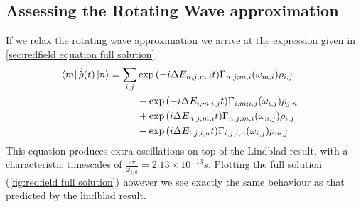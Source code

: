 \subsection{Assessing the Rotating Wave approximation}
If we relax the rotating wave approximation
we arrive at the expression given in \cref{sec:redfield equation full solution}.
\begin{align}
  \bra{m}\dot{\hat{\rho{}}}(t) \ket{n} & = \begin{aligned}[t]
    \sum_{i,j} &
    \exp{(-i\Delta{}E_{n,j;m,i} t)}
    \Gamma_{n,j;m, i}(\omega_{m,i})
    \rho_{i,j}   \\
               &
    -\exp{(-i\Delta{}E_{i,m;i,j} t)}
    \Gamma_{i,m;i, j}(\omega_{i,j})
    \rho_{j, n}  \\
               &
    +\exp{(i\Delta{}E_{n,j;m,i} t)}
    \Gamma_{n,j; m, i}(\omega_{n,j})
    \rho_{i, j}  \\
               &
    -\exp{(i\Delta{}E_{i,j;i,n} t)}
    \Gamma_{i,j; i, n}(\omega_{i,j})
    \rho_{m, j}
  \end{aligned}
\end{align}
This equation produces extra oscillations
on top of the Lindblad result, with
a characteristic timescales of
\(\frac{2\pi}{\omega_{1,0}} = 2.13\times{}10^{-13}s\). Plotting
the full solution (\cref{fig:redfield full solution})
however we see exactly the same behaviour as that
predicted by the lindblad result.

